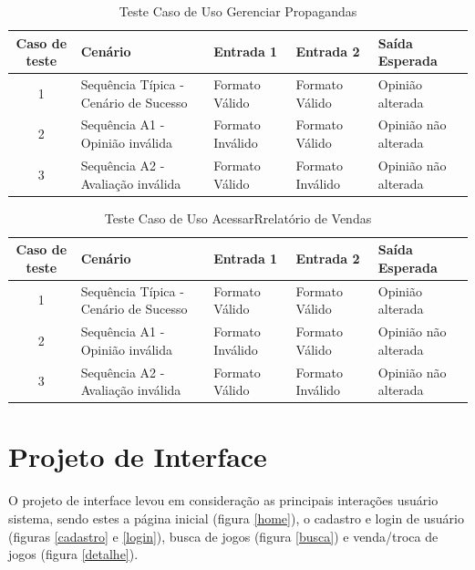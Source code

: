 \documentclass[a4paper,11pt]{article}
\begin{document}
	\begin{center}
	\begin{table}[H]
		\begin{tabularx}{\textwidth}{c|X|X|X|X}
			\textbf{Caso de teste} & \textbf{Cenário} & \textbf{Entrada 1} & \textbf{Entrada 2} & \textbf{Saída Esperada} \\
			\hline
			1 & Sequência Típica - Cenário de Sucesso & Formato Válido & Formato Válido & Opinião alterada\\ \hline
			2 & Sequência A1 - Opinião inválida & Formato Inválido & Formato Válido & Opinião não alterada\\ \hline
			3 & Sequência A2 - Avaliação inválida & Formato Válido & Formato Inválido & Opinião não alterada\\ \hline
			
		\end{tabularx}
		\caption{Teste Caso de Uso Gerenciar Propagandas}
	\end{table}
	\end{center}
	
	\begin{center}
	\begin{table}[H]
		\begin{tabularx}{\textwidth}{c|X|X|X|X}
			\textbf{Caso de teste} & \textbf{Cenário} & \textbf{Entrada 1} & \textbf{Entrada 2} & \textbf{Saída Esperada} \\
			\hline
			1 & Sequência Típica - Cenário de Sucesso & Formato Válido & Formato Válido & Opinião alterada\\ \hline
			2 & Sequência A1 - Opinião inválida & Formato Inválido & Formato Válido & Opinião não alterada\\ \hline
			3 & Sequência A2 - Avaliação inválida & Formato Válido & Formato Inválido & Opinião não alterada\\ \hline
			
		\end{tabularx}
		\caption{Teste Caso de Uso AcessarRrelatório de Vendas}
	\end{table}
	\end{center}	
	
\section{Projeto de Interface}

O projeto de interface levou em consideração as principais interações usuário sistema, sendo estes a página inicial (figura \ref{home}), o cadastro e login de usuário (figuras \ref{cadastro} e \ref{login}), busca de jogos (figura \ref{busca}) e venda/troca de jogos (figura \ref{detalhe}).
\end{document}

